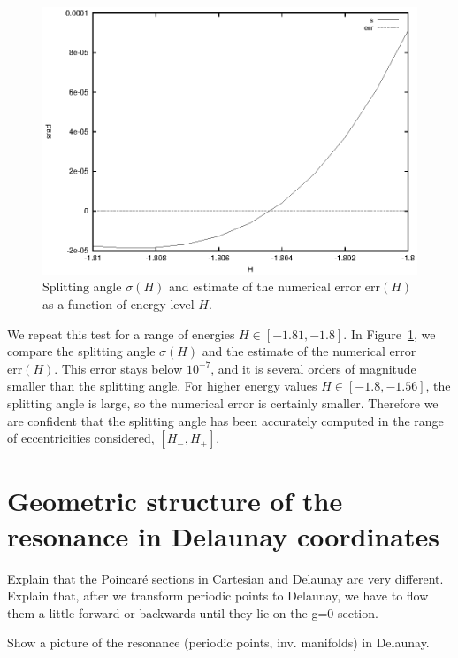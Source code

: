\begin{figure}
\includegraphics{figs/diffs}
\caption{Splitting angle $\sigma(H)$ and estimate of the numerical
error $\mathrm{err}(H)$ as a function of energy level $H$.}
\label{fig:diffs}
\end{figure}

We repeat this test for a range of energies $H\in[-1.81,-1.8]$.
In Figure~\ref{fig:diffs}, we compare the splitting angle $\sigma(H)$
and the estimate of the numerical error $\mathrm{err}(H)$. This error stays
below $10^{-7}$, and it is several orders of magnitude smaller than
the splitting angle.
For higher energy values $H\in[-1.8,-1.56]$, the splitting angle is
large, so the numerical error is certainly smaller.
Therefore we are confident that the splitting angle has been accurately
computed in the range of eccentricities considered,
$[H_-,H_+]$.


\section{Geometric structure of the resonance in Delaunay coordinates}
\label{sec:geometric_structure_delaunay}

Explain that the Poincar\'e sections in Cartesian and Delaunay are very
different. Explain that, after we transform periodic points to
Delaunay, we have to flow them a little forward or backwards until
they lie on the {g=0} section.

Show a picture of the resonance (periodic points, inv. manifolds) in
Delaunay.

